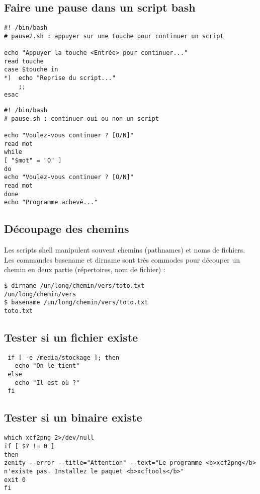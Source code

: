 \documentclass[a4paper,twoside]{article}
\begin{document}
\subsection{Faire une pause dans un script bash}
\begin{verbatim}
#! /bin/bash
# pause2.sh : appuyer sur une touche pour continuer un script

echo "Appuyer la touche <Entrée> pour continuer..."
read touche
case $touche in
*)	echo "Reprise du script..."
	;;
esac
\end{verbatim}

\begin{verbatim}
#! /bin/bash
# pause.sh : continuer oui ou non un script

echo "Voulez-vous continuer ? [O/N]"
read mot
while
[ "$mot" = "O" ]
do
echo "Voulez-vous continuer ? [O/N]"
read mot
done
echo "Programme achevé..."
\end{verbatim}

\subsection{Découpage des chemins}
Les scripts shell manipulent souvent chemins (pathnames) et noms de fichiers. Les commandes basename et dirname sont très commodes pour découper un chemin en deux partie (répertoires, nom de fichier) :
\begin{verbatim}
$ dirname /un/long/chemin/vers/toto.txt
/un/long/chemin/vers
$ basename /un/long/chemin/vers/toto.txt
toto.txt
\end{verbatim}


\subsection{Tester si un fichier existe}
\begin{verbatim}
 if [ -e /media/stockage ]; then
   echo "On le tient"
 else
   echo "Il est où ?"
 fi
\end{verbatim}

\subsection{Tester si un binaire existe}
\begin{verbatim}
which xcf2png 2>/dev/null
if [ $? != 0 ]
then
zenity --error --title="Attention" --text="Le programme <b>xcf2png</b> n'existe pas. Installez le paquet <b>xcftools</b>"
exit 0
fi
\end{verbatim}
\end{document}
